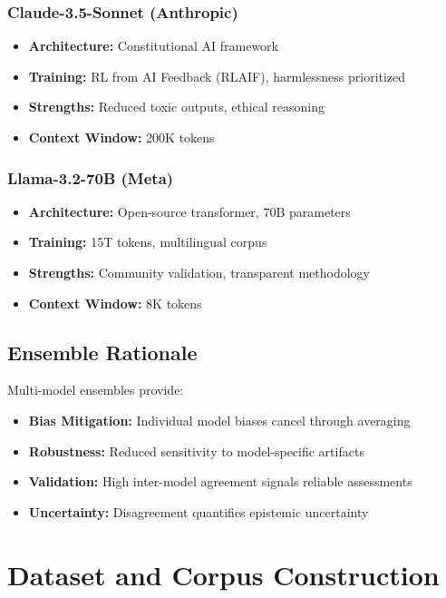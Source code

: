 \documentclass[11pt,a4paper]{article}
\begin{document}
\subsubsection{Claude-3.5-Sonnet (Anthropic)}
\begin{itemize}
    \item \textbf{Architecture:} Constitutional AI framework
    \item \textbf{Training:} RL from AI Feedback (RLAIF), harmlessness prioritized
    \item \textbf{Strengths:} Reduced toxic outputs, ethical reasoning
    \item \textbf{Context Window:} 200K tokens
\end{itemize}

\subsubsection{Llama-3.2-70B (Meta)}
\begin{itemize}
    \item \textbf{Architecture:} Open-source transformer, 70B parameters
    \item \textbf{Training:} 15T tokens, multilingual corpus
    \item \textbf{Strengths:} Community validation, transparent methodology
    \item \textbf{Context Window:} 8K tokens
\end{itemize}

\subsection{Ensemble Rationale}

Multi-model ensembles provide:
\begin{itemize}
    \item \textbf{Bias Mitigation:} Individual model biases cancel through averaging
    \item \textbf{Robustness:} Reduced sensitivity to model-specific artifacts
    \item \textbf{Validation:} High inter-model agreement signals reliable assessments
    \item \textbf{Uncertainty:} Disagreement quantifies epistemic uncertainty
\end{itemize}

\section{Dataset and Corpus Construction}
\end{document}
